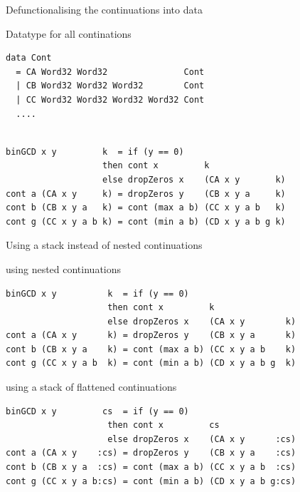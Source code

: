 \documentclass[pdf]{beamer}
\begin{document}
\begin{frame}[fragile]{Defunctionalising the continuations into data}
\begin{block}{Datatype for all continations}  %
\begin{verbatim}
data Cont
  = CA Word32 Word32               Cont
  | CB Word32 Word32 Word32        Cont
  | CC Word32 Word32 Word32 Word32 Cont
  ....
\end{verbatim}
\end{block}

\begin{block}{}
\begin{small}
\begin{verbatim}

binGCD x y         k  = if (y == 0)
                   then cont x         k
                   else dropZeros x    (CA x y       k)
cont a (CA x y     k) = dropZeros y    (CB x y a     k)
cont b (CB x y a   k) = cont (max a b) (CC x y a b   k)
cont g (CC x y a b k) = cont (min a b) (CD x y a b g k)
\end{verbatim}
\end{small}
\end{block}

\end{frame}


\begin{frame}[fragile]{Using a stack instead of nested continuations}
\begin{small}
\begin{block}{using nested continuations}
\begin{verbatim}
binGCD x y          k  = if (y == 0)
                    then cont x         k
                    else dropZeros x    (CA x y        k)
cont a (CA x y      k) = dropZeros y    (CB x y a      k)
cont b (CB x y a    k) = cont (max a b) (CC x y a b    k)
cont g (CC x y a b  k) = cont (min a b) (CD x y a b g  k)
\end{verbatim}
\end{block}
\begin{block}{using a stack of flattened continuations}
\begin{verbatim}
binGCD x y         cs  = if (y == 0)
                    then cont x         cs
                    else dropZeros x    (CA x y      :cs)
cont a (CA x y    :cs) = dropZeros y    (CB x y a    :cs)
cont b (CB x y a  :cs) = cont (max a b) (CC x y a b  :cs)
cont g (CC x y a b:cs) = cont (min a b) (CD x y a b g:cs)
\end{verbatim}
\end{block}
\end{small}
\end{frame}
\end{document}
